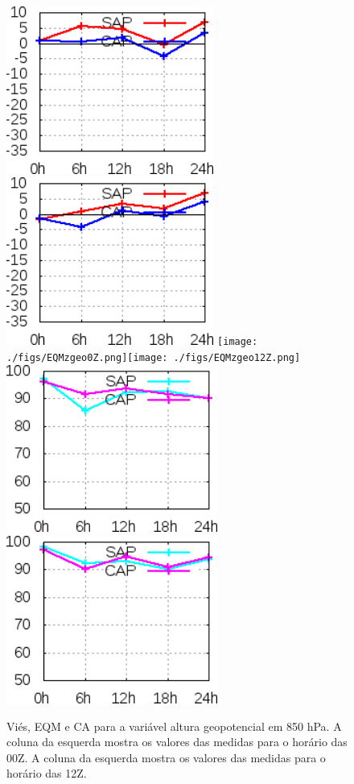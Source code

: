 \begin{figure}[!hbp]
\includegraphics[height=5.5cm]{./figs/VIES850zgeo0Z.png}\includegraphics[height=5.5cm]{./figs/VIES850zgeo12Z.png}
\texttt{[image: ./figs/EQMzgeo0Z.png]}\texttt{[image: ./figs/EQMzgeo12Z.png]}
\includegraphics[height=5.5cm]{./figs/CA850zgeo0Z.png}\includegraphics[height=5.5cm]{./figs/CA850zgeo12Z.png}
\caption{Viés, EQM e CA para a variável altura geopotencial em 850 hPa. A coluna da esquerda mostra os valores das medidas para o horário das 00Z. A coluna da esquerda mostra os valores das medidas para o horário das 12Z.}
\label{fig09}
\end{figure}

